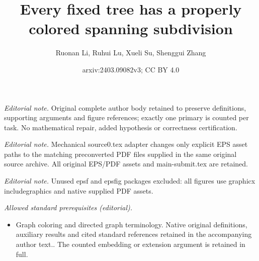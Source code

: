 \documentclass[10pt,a4paper]{article}
\title{Every fixed tree has a properly colored spanning subdivision}
\author{Ruonan Li, Ruhui Lu, Xueli Su, Shenggui Zhang}
\date{arxiv:2403.09082v3; CC BY 4.0}
\theoremstyle{definition}
\begin{document}
\maketitle
\noindent\textit{Editorial note.} Original complete author body retained to preserve definitions, supporting arguments and figure references; exactly one primary is counted per task. No mathematical repair, added hypothesis or correctness certification.\par\medskip
\noindent\textit{Editorial note.} Mechanical source0.tex adapter changes only explicit EPS asset paths to the matching preconverted PDF files supplied in the same original source archive. All original EPS/PDF assets and main-submit.tex are retained.\par\medskip
\noindent\textit{Editorial note.} Unused epsf and epsfig packages excluded: all figures use graphicx includegraphics and native supplied PDF assets.\par\medskip
\noindent\textit{Allowed standard prerequisites (editorial).}\begin{itemize}
\item Graph coloring and directed graph terminology. Native original definitions, auxiliary results and cited standard references retained in the accompanying author text.. The counted embedding or extension argument is retained in full.
\end{itemize}\medskip
\end{document}
